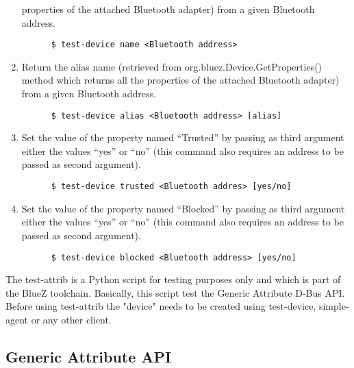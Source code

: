 \documentclass[11pt]{article}
\begin{document}
\begin{enumerate}
        properties of the attached Bluetooth adapter) from a given
        Bluetooth address.
    \begin{verbatim}
      $ test-device name <Bluetooth address>
    \end{verbatim}
  \item Return the alias name (retrieved from
        org.bluez.Device.GetProperties() method which returns all the
        properties of the attached Bluetooth adapter) from a given
        Bluetooth address.
    \begin{verbatim}
      $ test-device alias <Bluetooth address> [alias]
    \end{verbatim}
  \item Set the value of the property named ``Trusted'' by passing as
        third argument either the values ``yes'' or ``no''
        (this command also requires an address to be passed as second
         argument).
    \begin{verbatim}
      $ test-device trusted <Bluetooth addres> [yes/no]
    \end{verbatim}
  \item Set the value of the property named ``Blocked'' by passing as
        third argument either the values ``yes'' or ``no''
        (this command also requires an address to be passed as second
         argument).
    \begin{verbatim}
      $ test-device blocked <Bluetooth address> [yes/no]
    \end{verbatim}
\end{enumerate}

The test-attrib is a Python script for testing purposes only and which is part
of the BlueZ toolchain. Basically, this script test the Generic Attribute
D-Bus API. Before using test-attrib the "device" needs to be created using
test-device, simple-agent or any other client.

\subsection{Generic Attribute API}
\end{document}
